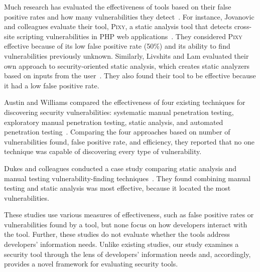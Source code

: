 \documentclass[10pt,journal,compsoc]{IEEEtran}
\begin{document}
Much research has evaluated the effectiveness of tools based on their false positive rates and how many vulnerabilities they detect~\cite{jovanovic2006pixy, austin2011one, dukes2013case}. 
For instance, Jovanovic and colleagues evaluate their tool, \textsc{Pixy}, a static analysis tool that detects cross-site scripting vulnerabilities in PHP web applications~\cite{jovanovic2006pixy}. 
They considered \textsc{Pixy} effective because of its low false positive rate (50\%) and its ability to find vulnerabilities previously unknown. 
Similarly, Livshits and Lam evaluated their own approach to security-oriented static analysis, which creates static analyzers based on inputs from the user~\cite{livshits2005finding}. 
They also found their tool to be effective because it had a low false positive rate. 

Austin and Williams compared the effectiveness of four existing techniques for discovering security vulnerabilities: systematic manual penetration testing, exploratory manual  penetration testing, static analysis, and automated penetration testing~\cite{austin2011one}. 
Comparing the four approaches based on number of vulnerabilities found, false positive rate, and efficiency, they reported that no one technique was capable of discovering every type of vulnerability. 

Dukes and colleagues conducted a case study comparing static analysis and manual testing vulnerability-finding techniques~\cite{dukes2013case}. 
They found combining manual testing and static analysis was most effective, because it located the most vulnerabilities.

These studies use various measures of effectiveness, such as false positive rates or vulnerabilities found by a tool, but none focus on how developers interact with the tool. 
Further, these studies do not evaluate whether the tools address developers' information needs. 
Unlike existing studies, our study examines a security tool through the lens of developers' information needs and, accordingly, provides a novel framework for evaluating security tools.
\end{document}
